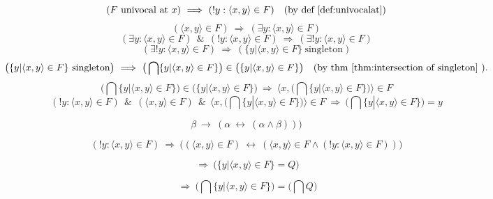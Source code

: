 \documentclass[10pt,a4paper]{article}
\theoremstyle{definition}
\newcommand{\AND}{\ \ \&\ \ }
\renewcommand{\iff}{\ \longleftrightarrow\ }
\newcommand{\IMPLIES}{\ \Longrightarrow\ }
\renewcommand{\implies}{\ \longrightarrow\ }
\newcommand{\intersection}{\bigcap}
\newcommand{\singleton}{\mathrm{\ singleton}}
\newcommand{\univocalat}{\mathrm{\ univocal\ at\ }}
\begin{document}
\[
(F\univocalat x)
\IMPLIES
(!y : \langle x,y\rangle \in F)
\quad\mbox{(by def \ref{def:univocalat})}
\]
\[
(\langle x,y\rangle\in F)
\IMPLIES
(\exists y : \langle x,y\rangle \in F)
\]
\[
(\exists y : \langle x,y\rangle \in F)
\AND
(!y : \langle x,y\rangle \in F)
\IMPLIES
(\exists! y : \langle x,y\rangle \in F)
\]
\[
(\exists! y : \langle x,y\rangle \in F)
\IMPLIES
(\{y | \langle x,y\rangle \in F\}\singleton)
\]
\[
\big(\{y| \langle x,y\rangle\in F\}\singleton\big)
\IMPLIES
\big(\intersection\{y| \langle x,y\rangle\in F\}\big)
\in
\big(\{y| \langle x,y\rangle\in F\}\big)\quad(\mbox{by thm \ref{thm:intersection of singleton} }).
\]
\[
\big(\intersection\{y| \langle x,y\rangle\in F\}\big)
\in
\big(\{y| \langle x,y\rangle\in F\}\big)
\IMPLIES
\langle x,\big(\intersection\{y| \langle x,y\rangle\in F\}\big)\rangle\in F
\]
\[
(!y : \langle x,y\rangle \in F)
\AND
(\langle x,y\rangle\in F)
\AND
\langle x,\big(\intersection\{y| \langle x,y\rangle\in F\}\big)\rangle\in F
\IMPLIES
\big(\intersection\{y| \langle x,y\rangle\in F\}\big)=y
\]


\[
\beta\implies(\alpha\iff(\alpha \land \beta)))
\]

\[
(!y: \langle x,y\rangle\in F)
\IMPLIES
\big(
(\langle x,y\rangle\in F)
\iff
(\langle x,y\rangle\in F \land (!y: \langle x,y\rangle\in F))
\big)
\]

\[
\IMPLIES
\big(
\{y| \langle x,y\rangle\in F\}
=
Q
\big)
\]


\[
\IMPLIES
\big(\intersection\{y| \langle x,y\rangle\in F\}\big)=
\big(\intersection
Q
\big)
\]

\end{document}
